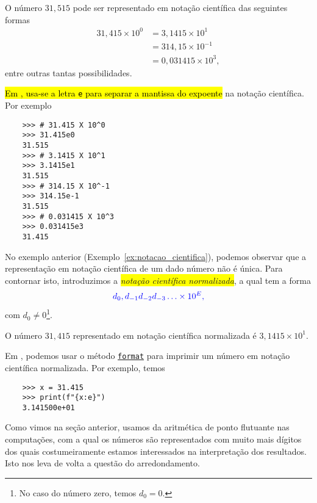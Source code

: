 \begin{ex}\label{ex:notacao_cientifica}
  O número $31,515$ pode ser representado em notação científica das seguintes formas
  \begin{align}
    31,415\times 10^0 &= 3,1415\times 10^{1} \\
                      &= 314,15\times 10^{-1} \\
                      &= 0,031415\times 10^{3},
  \end{align}
  entre outras tantas possibilidades.

  \hl{Em {\python}, usa-se a letra \texttt{e} para separar a mantissa do expoente} na notação científica. Por exemplo
  \begin{lstlisting}
    >>> # 31.415 X 10^0
    >>> 31.415e0
    31.515
    >>> # 3.1415 X 10^1
    >>> 3.1415e1
    31.515
    >>> # 314.15 X 10^-1
    >>> 314.15e-1
    31.515
    >>> # 0.031415 X 10^3
    >>> 0.031415e3
    31.415
  \end{lstlisting}
\end{ex}

No exemplo anterior (Exemplo~\ref{ex:notacao_cientifica}), podemos observar que a representação em notação científica de um dado número não é única. Para contornar isto, introduzimos a \colorbox{yellow}{\emph{notação científica normalizada}}, a qual tem a forma
\begin{equation}
  \color{blue}d_0,d_{-1}d_{-2}d_{-3}\ldots\times 10^{E},
\end{equation}
com $d_0 \neq 0$\footnote{No caso do número zero, temos $d_0=0$.}.

\begin{ex}
  O número $31,415$ representado em notação científica normalizada é $3,1415\times 10^{1}$.

  Em {\python}, podemos usar o método \href{https://docs.python.org/3.8/library/string.html#formatspec}{\lstinline+format+} para imprimir um número em notação científica normalizada. Por exemplo, temos
  \begin{lstlisting}
    >>> x = 31.415
    >>> print(f"{x:e}")
    3.141500e+01
  \end{lstlisting}
\end{ex}

Como vimos na seção anterior, usamos da aritmética de ponto flutuante nas computações, com a qual os números são representados com muito mais dígitos dos quais costumeiramente estamos interessados na interpretação dos resultados. Isto nos leva de volta a questão do arredondamento.

